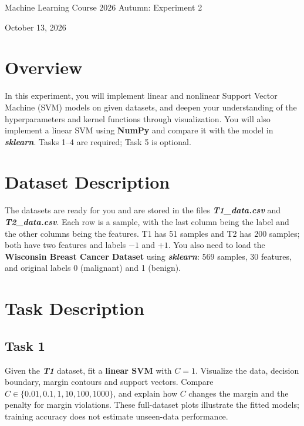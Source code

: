 \documentclass[12pt,a4paper]{article}
\begin{document}
\begin{center}
  {\LARGE Machine Learning Course 2026 Autumn: Experiment 2}

  \vspace{1.35cm}
  {\large October 13, 2026}
\end{center}

\vspace{0.7cm}

\section{Overview}

In this experiment, you will implement linear and nonlinear Support Vector
Machine (SVM) models on given datasets, and deepen your understanding of the
hyperparameters and kernel functions through visualization. You will also
implement a linear SVM using \textbf{NumPy} and compare it with the model in
\textbf{\textit{sklearn}}. Tasks 1--4 are required; Task 5 is optional.

\section{Dataset Description}

\begin{sloppypar}
The datasets are ready for you and are stored in the files
\textbf{\textit{T1\_data.csv}} and \textbf{\textit{T2\_data.csv}}.
Each row is a sample, with the last column being the label and the other columns
being the features. T1 has 51 samples and T2 has 200 samples; both have two
features and labels $-1$ and $+1$. You also need to load the
\textbf{Wisconsin Breast Cancer Dataset} using \textbf{\textit{sklearn}}:
569 samples, 30 features, and original labels 0 (malignant) and 1 (benign).
\end{sloppypar}

\section{Task Description}

\subsection{Task 1}

Given the \textbf{\textit{T1}} dataset, fit a \textbf{linear SVM} with $C=1$.
Visualize the data, decision boundary, margin contours and support vectors.
Compare $C\in\{0.01,0.1,1,10,100,1000\}$, and explain how $C$ changes the
margin and the penalty for margin violations. These full-dataset plots illustrate
the fitted models; training accuracy does not estimate unseen-data performance.
\end{document}
